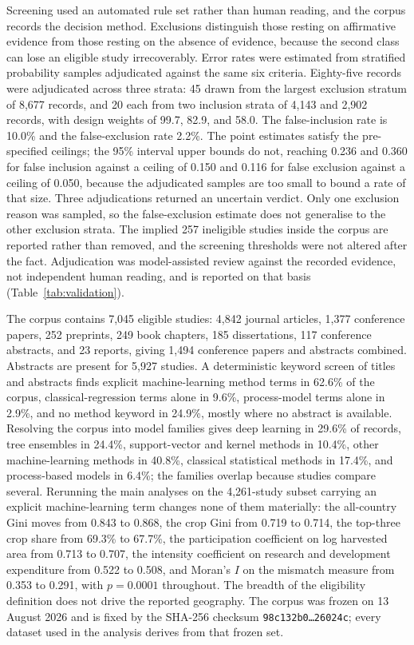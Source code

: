 \documentclass[ASNA,twocolumn]{USG}
\begin{document}
Screening used an automated rule set rather than human reading, and the
corpus records the decision method. Exclusions distinguish those resting on
affirmative evidence from those resting on the absence of evidence, because the second class can lose an
eligible study irrecoverably. Error rates were estimated from stratified probability samples adjudicated against the same six
criteria. Eighty-five records were adjudicated across three strata: 45 drawn from the largest
exclusion stratum of 8,677 records, and 20 each from two inclusion strata of 4,143 and 2,902
records, with design weights of 99.7, 82.9, and 58.0. The false-inclusion rate is 10.0\% and the
false-exclusion rate 2.2\%. The point estimates satisfy the pre-specified ceilings; the 95\%
interval upper bounds do not, reaching 0.236 and 0.360 for false inclusion against a ceiling of
0.150 and 0.116 for false exclusion against a ceiling of 0.050, because the adjudicated samples
are too small to bound a rate of that size. Three adjudications returned an uncertain verdict.
Only one exclusion reason was sampled, so the false-exclusion estimate does not generalise to the
other exclusion strata. The implied 257 ineligible studies inside the corpus are reported rather
than removed, and the screening thresholds were not altered after the fact. Adjudication was
model-assisted review against the recorded evidence, not independent human reading, and is
reported on that basis (Table~\ref{tab:validation}).

The corpus contains 7,045 eligible studies: 4,842 journal articles, 1,377 conference
papers, 252 preprints, 249 book chapters, 185 dissertations, 117 conference abstracts, and 23
reports, giving 1,494 conference papers and abstracts combined. Abstracts are present for
5,927 studies. A deterministic keyword screen of titles and abstracts finds explicit machine-learning method
terms in 62.6\% of the corpus, classical-regression terms alone in 9.6\%, process-model terms
alone in 2.9\%, and no method keyword in 24.9\%, mostly where no abstract is available. Resolving
the corpus into model families gives deep learning in 29.6\% of records, tree ensembles in
24.4\%, support-vector and kernel methods in 10.4\%, other machine-learning methods in 40.8\%,
classical statistical methods in 17.4\%, and process-based models in 6.4\%; the families overlap
because studies compare several. Rerunning the main analyses on the 4,261-study subset carrying
an explicit machine-learning term changes none of them materially: the all-country Gini moves
from 0.843 to 0.868, the crop Gini from 0.719 to 0.714, the top-three crop share from 69.3\% to
67.7\%, the participation coefficient on log harvested area from 0.713 to 0.707, the intensity
coefficient on research and development expenditure from 0.522 to 0.508, and Moran's $I$ on the
mismatch measure from 0.353 to 0.291, with $p = 0.0001$ throughout. The breadth of the
eligibility definition does not drive the reported geography. The corpus was frozen on 13 August 2026 and is fixed by the SHA-256 checksum
\texttt{98c132b0\ldots26024c}; every dataset used in the analysis derives from that frozen
set.
\end{document}
